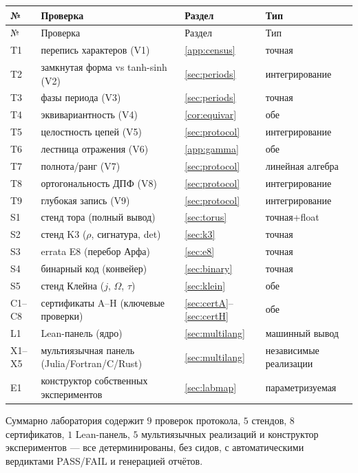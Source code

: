 \begin{center}
\small
\begin{longtable}{@{}p{0.9cm} p{6.4cm} p{3.0cm} p{2.4cm}@{}}
\toprule
№ & Проверка & Раздел & Тип \\
\midrule
\endfirsthead
\toprule
№ & Проверка & Раздел & Тип \\
\midrule
\endhead
\bottomrule
\endfoot
T1 & перепись характеров (V1) & \ref{app:census} & точная \\
T2 & замкнутая форма vs tanh-sinh (V2) & \ref{sec:periods} &
интегрирование \\
T3 & фазы периода (V3) & \ref{sec:periods} & точная \\
T4 & эквивариантность (V4) & \ref{cor:equivar} & обе \\
T5 & целостность цепей (V5) & \ref{sec:protocol} &
интегрирование \\
T6 & лестница отражения (V6) & \ref{app:gamma} & обе \\
T7 & полнота/ранг (V7) & \ref{sec:protocol} & линейная алгебра \\
T8 & ортогональность ДПФ (V8) & \ref{sec:protocol} &
интегрирование \\
T9 & глубокая запись (V9) & \ref{sec:protocol} &
интегрирование \\
S1 & стенд тора (полный вывод) & \ref{sec:torus} & точная+float \\
S2 & стенд K3 ($\rho$, сигнатура, det) & \ref{sec:k3} & точная \\
S3 & errata E8 (перебор Арфа) & \ref{sec:e8} & точная \\
S4 & бинарный код (конвейер) & \ref{sec:binary} & точная \\
S5 & стенд Клейна ($j$, $\Omega$, $\tau$) & \ref{sec:klein} &
обе \\
C1--C8 & сертификаты A--H (ключевые проверки) &
\ref{sec:certA}--\ref{sec:certH} & обе \\
L1 & Lean-панель (ядро) & \ref{sec:multilang} & машинный вывод \\
X1--X5 & мультиязычная панель (Julia/Fortran/C/Rust) &
\ref{sec:multilang} & независимые реализации \\
E1 & конструктор собственных экспериментов &
\ref{sec:labmap} & параметризуемая \\
\end{longtable}
\end{center}

Суммарно лаборатория содержит $9$ проверок протокола, $5$ стендов,
$8$ сертификатов, $1$ Lean-панель, $5$ мультиязычных реализаций и
конструктор экспериментов --- все детерминированы, без сидов, с
автоматическими вердиктами PASS/FAIL и генерацией отчётов.
